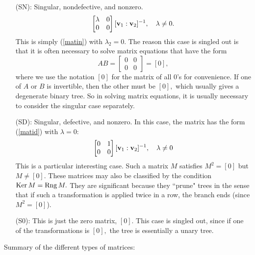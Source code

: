 \documentclass{article}
\def\mat#1#2#3#4{
\left[\begin{matrix}#1&#2\\#3&#4\end{matrix}\right]
}
\def\Ker{\hbox{Ker\,}}
\def\Rng{\hbox{Rng\,}}
\begin{document}
\begin{enumerate}
\item[(SN):] Singular, nondefective, and nonzero.
\begin{equation}
[{\bf v}_1:{\bf v}_2]\left[\begin{matrix}\lambda&0\\0&0\end{matrix}\right][{\bf v}_1:{\bf v}_2]^{-1},\quad\lambda\ne0.
\end{equation}
This is simply (\ref{matin}) with $\lambda_2=0.$ The reason this case is singled out is that it is often necessary to solve matrix equations that have the form $$AB=\mat0000=[0],$$ where we use the notation $[0]$ for the matrix of all $0$'s for convenience. If one of $A$ or $B$ is invertible, then the other must be $[0],$ which usually gives a degenerate binary tree. So in solving matrix equations, it is usually necessary to consider the singular case separately.

\item[(SD):]  Singular, defective, and nonzero. In this case, the matrix has the form (\ref{matid}) with $\lambda=0:$
\begin{equation}
[{\bf v}_1:{\bf v}_2]\left[\begin{matrix}0&1\\0&0\end{matrix}\right][{\bf v}_1:{\bf v}_2]^{-1},\quad\lambda\ne0\label{matsd}
\end{equation}
This is a particular interesting case.  Such a matrix $M$ satisfies $M^2=[0]$ but $M\ne[0].$ These matrices may also be classified by the condition $\Ker M=\Rng M.$ They are significant because they ``prune" trees in the sense that if such a transformation is applied twice in a row, the branch ends (since $M^2=[0]$).

\item[(S0):] This is just the zero matrix, $[0].$ This case is singled out, since if one of the transformations is $[0],$ the tree is essentially a unary tree.

\end{enumerate}

Summary of the different types of matrices:
\end{document}
